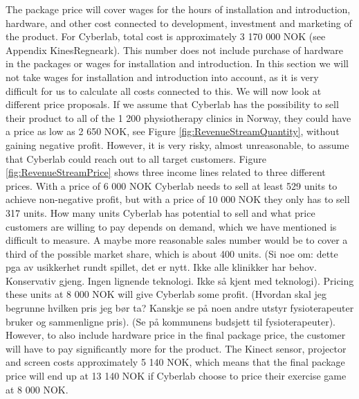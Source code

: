The package price will cover wages for the hours of installation and introduction, hardware, and other cost connected to development, investment and marketing of the product. For Cyberlab, total cost is approximately 3 170 000 NOK (see Appendix KinesRegneark). This number does not include purchase of hardware in the packages or wages for installation and introduction. In this section we will not take wages for installation and introduction into account, as it is very difficult for us to calculate all costs connected to this. We will now look at different price proposals. If we assume that Cyberlab has the possibility to sell their product to all of the 1 200 physiotherapy clinics in Norway, they could have a price as low as 2 650 NOK, see Figure \ref{fig:RevenueStreamQuantity}, without gaining negative profit. However, it is very risky, almost unreasonable, to assume that Cyberlab could reach out to all target customers. Figure \ref{fig:RevenueStreamPrice} shows three income lines related to three different prices. With a price of 6 000 NOK Cyberlab needs to sell at least 529 units to achieve non-negative profit, but with a price of 10 000 NOK they only has to sell 317 units. How many units Cyberlab has potential to sell and what price customers are willing to pay depends on demand, which we have mentioned is difficult to measure. A maybe more reasonable sales number would be to cover a third of the possible market share, which is about 400 units. (Si noe om: dette pga av usikkerhet rundt spillet, det er nytt. Ikke alle klinikker har behov. Konservativ gjeng. Ingen lignende teknologi. Ikke s{å} kjent med teknologi). Pricing these units at 8 000 NOK will give Cyberlab some profit. (Hvordan skal jeg begrunne hvilken pris jeg b{ø}r ta? Kanskje se p{å} noen andre utstyr fysioterapeuter bruker og sammenligne pris). (Se p{å} kommunens budsjett til fysioterapeuter). However, to also include hardware price in the final package price, the customer will have to pay significantly more for the product. The Kinect sensor, projector and screen costs approximately 5 140 NOK, which means  that the final package price will end up at 13 140 NOK if Cyberlab choose to price their exercise game at 8 000 NOK.\\ \\
